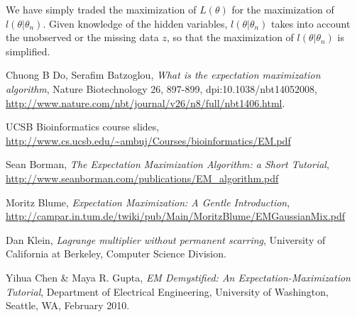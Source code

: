 \documentclass{article}  %
\begin{document}
We have simply traded the maximization of $L(\theta)$ for the maximization of $l(\theta|\theta_n)$. Given knowledge of the hidden variables, $l(\theta|\theta_n)$ takes into account the unobserved or the missing data $z$, so that the maximization of $l(\theta|\theta_n)$ is simplified. 

\begin{thebibliography}{9}

 Chuong B Do,  Serafim Batzoglou, \emph{What is the expectation maximization algorithm}, Nature Biotechnology 26, 897-899, dpi:10.1038/nbt14052008, \url{http://www.nature.com/nbt/journal/v26/n8/full/nbt1406.html}.

 UCSB Bioinformatics course slides, \url{http://www.cs.ucsb.edu/~ambuj/Courses/bioinformatics/EM.pdf}

 Sean Borman, \emph{The Expectation Maximization Algorithm: a Short Tutorial}, \url{http://www.seanborman.com/publications/EM_algorithm.pdf}

 Moritz Blume, \emph{Expectation Maximization: A Gentle
Introduction},
\url{http://campar.in.tum.de/twiki/pub/Main/MoritzBlume/EMGaussianMix.pdf}

 Dan Klein, \emph{Lagrange multiplier without permanent
scarring}, University of California at Berkeley, Computer Science Division.

 Yihua Chen \& Maya R. Gupta, \emph{EM Demystified: An
Expectation-Maximization Tutorial}, Department of Electrical Engineering,
University of Washington, Seattle, WA, February 2010.

\end{thebibliography}
\end{document}
